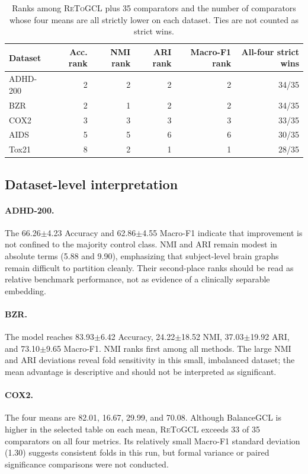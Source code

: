 \documentclass[10pt,twocolumn]{article}
\newcommand{\method}{\textsc{ReToGCL}}
\begin{document}
\begin{table}[t]
\centering
\caption{Ranks among \method{} plus 35 comparators and the number of comparators whose four means are all strictly lower on each dataset. Ties are not counted as strict wins.}
\label{tab:ranks}
\small
\begin{tabular}{lrrrrr}
\toprule
Dataset & Acc. rank & NMI rank & ARI rank & Macro-F1 rank & All-four strict wins \\
\midrule
ADHD-200 & 2 & 2 & 2 & 2 & 34/35 \\
BZR      & 2 & 1 & 2 & 2 & 34/35 \\
COX2     & 3 & 3 & 3 & 3 & 33/35 \\
AIDS     & 5 & 5 & 6 & 6 & 30/35 \\
Tox21    & 8 & 2 & 1 & 1 & 28/35 \\
\bottomrule
\end{tabular}
\end{table}

\subsection{Dataset-level interpretation}

\paragraph{ADHD-200.}
The 66.26$\pm$4.23 Accuracy and 62.86$\pm$4.55 Macro-F1 indicate that improvement is not confined to the majority control class. NMI and ARI remain modest in absolute terms (5.88 and 9.90), emphasizing that subject-level brain graphs remain difficult to partition cleanly. Their second-place ranks should be read as relative benchmark performance, not as evidence of a clinically separable embedding.

\paragraph{BZR.}
The model reaches 83.93$\pm$6.42 Accuracy, 24.22$\pm$18.52 NMI, 37.03$\pm$19.92 ARI, and 73.10$\pm$9.65 Macro-F1. NMI ranks first among all methods. The large NMI and ARI deviations reveal fold sensitivity in this small, imbalanced dataset; the mean advantage is descriptive and should not be interpreted as significant.

\paragraph{COX2.}
The four means are 82.01, 16.67, 29.99, and 70.08. Although BalanceGCL is higher in the selected table on each mean, \method{} exceeds 33 of 35 comparators on all four metrics. Its relatively small Macro-F1 standard deviation (1.30) suggests consistent folds in this run, but formal variance or paired significance comparisons were not conducted.
\end{document}
